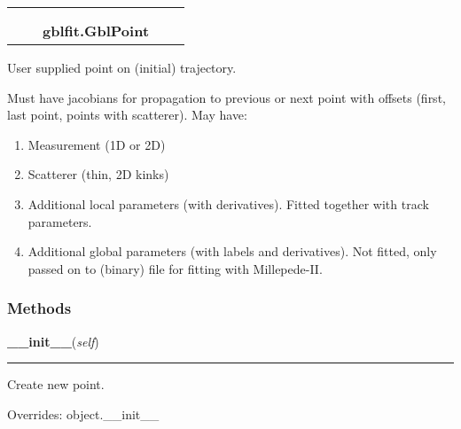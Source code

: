     \label{gblfit:GblPoint}
\begin{tabular}{cccccc}
\multicolumn{2}{r}{\settowidth{\BCL}{object}\multirow{2}{\BCL}{object}}
&&
  \\\cline{3-3}
  &&\multicolumn{1}{c|}{}
&&
  \\
&&\multicolumn{2}{l}{\textbf{gblfit.GblPoint}}
\end{tabular}

User supplied point on (initial) trajectory.

Must have jacobians for propagation to previous or next point with offsets 
(first, last point, points with scatterer). May have:

\begin{enumerate}

\setlength{\parskip}{0.5ex}
  \item Measurement (1D or 2D)

  \item Scatterer (thin, 2D kinks)

  \item Additional local parameters (with derivatives). Fitted together with 
    track parameters.

  \item Additional global parameters (with labels and derivatives). Not fitted,
    only passed on to (binary) file for fitting with Millepede-II.

\end{enumerate}



  \subsubsection{Methods}

    \vspace{0.5ex}

\hspace{.8\funcindent}\begin{boxedminipage}{\funcwidth}

    \raggedright \textbf{\_\_init\_\_}(\textit{self})

    \vspace{-1.5ex}

    \rule{\textwidth}{0.5\fboxrule}
\setlength{\parskip}{2ex}
    Create new point.

\setlength{\parskip}{1ex}
      Overrides: object.\_\_init\_\_

    \end{boxedminipage}

